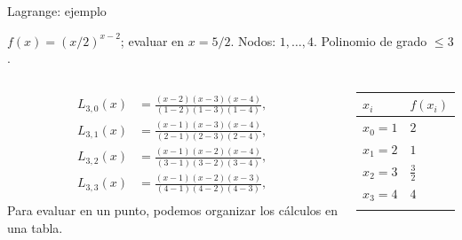 \documentclass[main.tex]{subfiles}
\begin{document}
\begin{frame}[t]{Lagrange: ejemplo}
\par\noindent\begin{minipage}[t][7.5mm][t]{\textwidth}\small\strut $f(x)=(x/2)^{x-2}$; evaluar en $x=5/2$. Nodos: $1,\ldots,4$. Polinomio de grado $\le 3$.\end{minipage}\par\nointerlineskip
\begin{columns}[T]\small\setlength{\abovedisplayskip}{4pt}\setlength{\belowdisplayskip}{4pt}\scriptsize\begin{align*}L_{3,0}(x)&=\frac{(x-2)(x-3)(x-4)}{(1-2)(1-3)(1-4)},\\L_{3,1}(x)&=\frac{(x-1)(x-3)(x-4)}{(2-1)(2-3)(2-4)},\\L_{3,2}(x)&=\frac{(x-1)(x-2)(x-4)}{(3-1)(3-2)(3-4)},\\L_{3,3}(x)&=\frac{(x-1)(x-2)(x-3)}{(4-1)(4-2)(4-3)},\\\end{align*}\small Para evaluar en un punto, podemos organizar los cálculos en una tabla.\begingroup\small\setlength{\tabcolsep}{3pt}\begin{center}\begin{tabular}{|C{.42\textwidth}|C{.42\textwidth}|}\hline
\rule[-2mm]{0pt}{6mm}$x_i$&$f(x_i)$\\\hline
\rule[-2.5mm]{0pt}{6mm}$x_0=1$&$2$\\\hline
\rule[-2.5mm]{0pt}{6mm}$x_1=2$&$1$\\\hline
\rule[-2.5mm]{0pt}{6mm}$x_2=3$&$\frac{3}{2}$\\\hline
\rule[-2.5mm]{0pt}{6mm}$x_3=4$&$4$\\\hline
\rule[-2.5mm]{0pt}{6mm}&\\\hline
\end{tabular}\end{center}\endgroup\par
\end{columns}
\end{frame}
\end{document}
